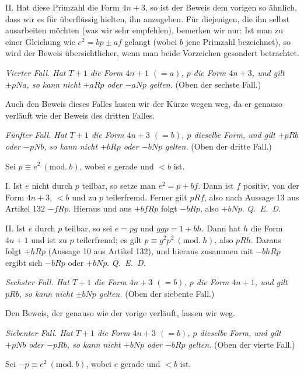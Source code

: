 II. Hat diese Primzahl die Form $4n+3$, so ist der Beweis dem vorigen so ähnlich, dass wir es für überflüssig hielten, ihn anzugeben. Für diejenigen, die ihn selbst ausarbeiten möchten (was wir sehr empfehlen), bemerken wir nur: Ist man zu einer Gleichung wie $e^2=bp\pm af$ gelangt (wobei $b$ jene Primzahl bezeichnet), so wird der Beweis übersichtlicher, wenn man beide Vorzeichen gesondert betrachtet.

\textit{Vierter Fall. Hat $T+1$ die Form $4n+1$ $(=a)$, $p$ die Form $4n+3$, und gilt $\pm pNa$, so kann nicht $+aRp$ oder $-aNp$ gelten.} (Oben der sechste Fall.)

Auch den Beweis dieses Falles lassen wir der Kürze wegen weg, da er genauso verläuft wie der Beweis des dritten Falles.

\textit{Fünfter Fall. Hat $T+1$ die Form $4n+3$ $(=b)$, $p$ dieselbe Form, und gilt $+pRb$ oder $-pNb$, so kann nicht $+bRp$ oder $-bNp$ gelten.} (Oben der dritte Fall.)

Sei $p\equiv e^2\ (\mathrm{mod.}\ b)$, wobei $e$ gerade und $<b$ ist.

I. Ist $e$ nicht durch $p$ teilbar, so setze man $e^2=p+bf$. Dann ist $f$ positiv, von der Form $4n+3$, $<b$ und zu $p$ teilerfremd. Ferner gilt $pRf$, also nach Aussage 13 aus Artikel 132 $-fRp$. Hieraus und aus $+bfRp$ folgt $-bRp$, also $+bNp$. \mbox{\textit{Q. E. D.}}

II. Ist $e$ durch $p$ teilbar, so sei $e=pg$ und $ggp=1+bh$. Dann hat $h$ die Form $4n+1$ und ist zu $p$ teilerfremd; es gilt $p\equiv g^2p^2\ (\mathrm{mod.}\ h)$, also $pRh$. Daraus folgt $+hRp$ (Aussage 10 aus Artikel 132), und hieraus zusammen mit $-bhRp$ ergibt sich $-bRp$ oder $+bNp$. \mbox{\textit{Q. E. D.}}

\textit{Sechster Fall. Hat $T+1$ die Form $4n+3$ $(=b)$, $p$ die Form $4n+1$, und gilt $pRb$, so kann nicht $\pm bNp$ gelten.} (Oben der siebente Fall.)

Den Beweis, der genauso wie der vorige verläuft, lassen wir weg.

\textit{Siebenter Fall. Hat $T+1$ die Form $4n+3$ $(=b)$, $p$ dieselbe Form, und gilt $+pNb$ oder $-pRb$, so kann nicht $+bNp$ oder $-bRp$ gelten.} (Oben der vierte Fall.)

Sei $-p\equiv e^2\ (\mathrm{mod.}\ b)$, wobei $e$ gerade und $<b$ ist.

